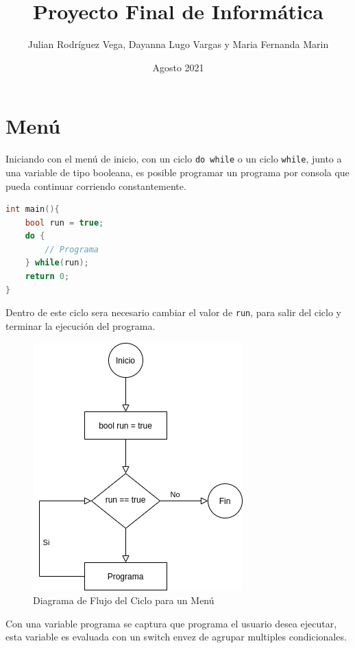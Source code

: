 \documentclass[12pt]{article}
\title{Proyecto Final de Informática}
\author{Julian Rodríguez Vega, Dayanna Lugo Vargas y Maria Fernanda Marin}
\date{Agosto 2021}
\begin{document}
\begin{titlepage}
\maketitle
\end{titlepage}

\section{Menú}

Iniciando con el menú de inicio, con un ciclo \verb+do while+ o un ciclo \verb+while+, junto a una variable de tipo booleana, es posible programar un programa por consola que pueda continuar corriendo constantemente.

\begin{lstlisting}[language=c++]
int main(){
    bool run = true;
    do {
        // Programa
    } while(run);
    return 0;
}
\end{lstlisting}

Dentro de este ciclo  sera necesario cambiar el valor de \verb+run+, para salir del ciclo y terminar la ejecución del programa.

\begin{figure}[h]
    \caption{Diagrama de Flujo del Ciclo para un Menú}
    \centering
    \includegraphics[scale=0.5]{menu_loop.png}
\end{figure}

Con una variable programa se captura que programa el usuario desea ejecutar, esta variable es evaluada con un switch envez de agrupar multiples condicionales.
\end{document}
